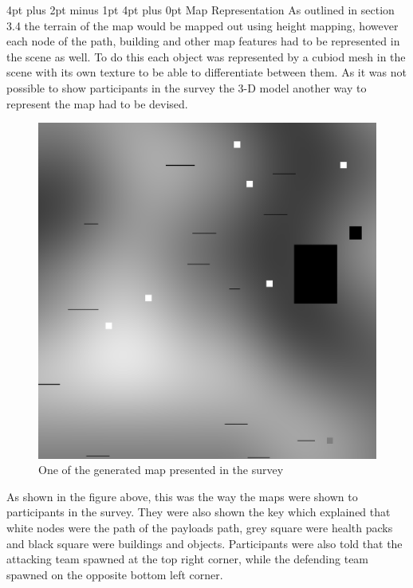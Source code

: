 \documentclass[12pt,a4paper,oneside]{book}
\makeatletter
\renewcommand\section{\@startsection {section}{1}{0mm} %
                               {4pt plus 2pt minus 1pt} %
                               {4pt plus 0pt} %
                               {\bfseries}}
\makeatother
\begin{document}
\section{Map Representation}
As outlined in section 3.4 the terrain of the map would be mapped out using height mapping, however each node of the path, building and other map features had to be represented in the scene as well. To do this each object was represented by a cubiod mesh in the scene with its own texture to be able to differentiate between them. As it was not possible to show participants in the survey the 3-D model another way to represent the map had to be devised.
\begin{figure}[h]
	\includegraphics[width=\linewidth]{images/4.png}
	\caption{One of the generated map presented in the survey}
\end{figure}
\vspace{5mm} 
\newline 
 As shown in the figure above, this was the way the maps were shown to participants in the survey. They were also shown the key which explained that white nodes were the path of the payloads path, grey square were health packs and black square were buildings and objects. Participants were also told that the attacking team spawned at the top right corner, while the defending team spawned on the opposite bottom left corner.
\end{document}
